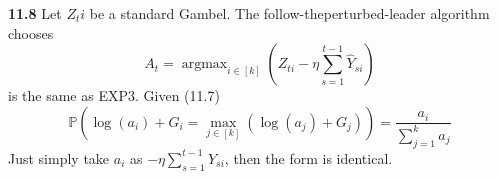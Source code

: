 \noindent\textbf{11.8} Let $Z_ti$ be a standard Gambel. The follow-theperturbed-leader algorithm chooses
\begin{equation}
    A_{t}=\operatorname{argmax}_{i \in[k]}\left(Z_{t i}-\eta \sum_{s=1}^{t-1} \hat{Y}_{s i}\right)
\end{equation}
is the same as EXP3. Given (11.7)
\begin{equation}
    \mathbb{P}\left(\log \left(a_{i}\right)+G_{i}=\max _{j \in[k]}\left(\log \left(a_{j}\right)+G_{j}\right)\right)=\frac{a_{i}}{\sum_{j=1}^{k} a_{j}}
\end{equation}
Just simply take $a_i$ as $-\eta \sum_{s=1}^{t-1} \hat{Y}_{s i}$, then the form is identical.